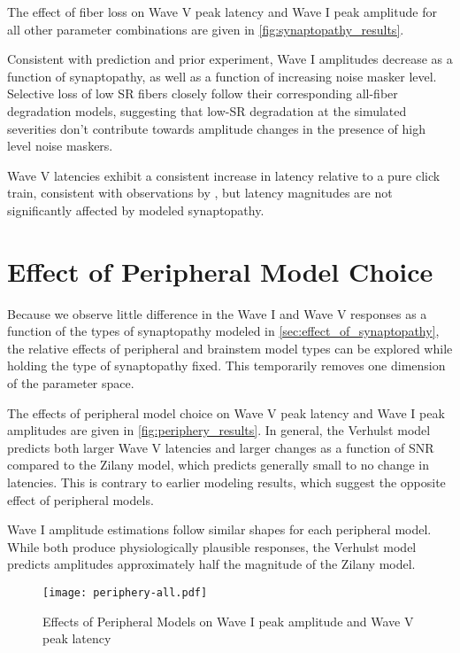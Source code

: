 The effect of fiber loss on Wave V peak latency and Wave I peak amplitude for all other parameter combinations are given in \autoref{fig:synaptopathy_results}.  

Consistent with prediction and prior experiment, Wave I amplitudes decrease as a function of synaptopathy, as well as a function of increasing noise masker level.  Selective loss of low SR fibers closely follow their corresponding all-fiber degradation models, suggesting that low-SR degradation at the simulated severities don't contribute towards amplitude changes in the presence of high level noise maskers. 

Wave V latencies exhibit a consistent increase in latency relative to a pure click train,  consistent with observations by \citeauthor{Mehraei2016Auditory}, but latency magnitudes are not significantly affected by modeled synaptopathy. 

\section{Effect of Peripheral Model Choice} %
\label{sec:effect_of_peripheral_model}
Because we observe little difference in the Wave I and Wave V responses as a function of the types of synaptopathy modeled in \autoref{sec:effect_of_synaptopathy}, the relative effects of peripheral and brainstem model types can be explored while holding the type of synaptopathy fixed.  This temporarily removes one dimension of the parameter space. 

The effects of peripheral model choice on Wave V peak latency and Wave I peak amplitudes are given in \autoref{fig:periphery_results}.   In general, the Verhulst model predicts both larger Wave V latencies and larger changes as a function of SNR compared to the Zilany model, which predicts generally small to no change in latencies.  This is contrary to earlier modeling results, which suggest the opposite effect of peripheral models. 

Wave I amplitude estimations follow similar shapes for each peripheral model.  While both produce physiologically plausible responses, the Verhulst model predicts amplitudes approximately half the magnitude of the Zilany model. 

\begin{figure}[htbp]
	\centering
	\texttt{[image: periphery-all.pdf]}
	\caption[Effects of Peripheral Models]{Effects of Peripheral Models on Wave I peak amplitude and Wave V peak latency}
	\label{fig:periphery_results}
\end{figure}

